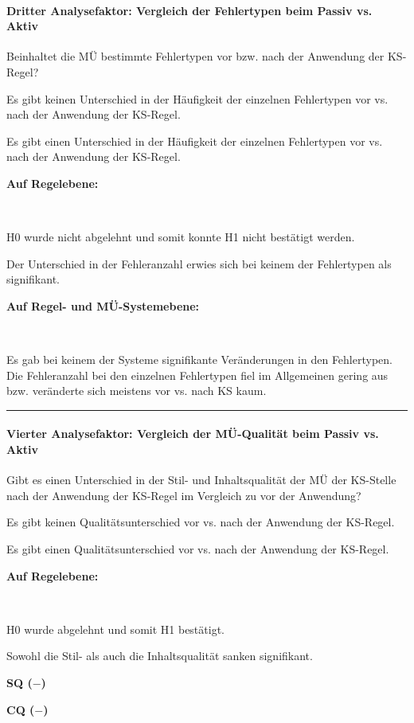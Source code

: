 \paragraph*{Dritter Analysefaktor: Vergleich der Fehlertypen beim Passiv vs. Aktiv}
\begin{description}[font=\normalfont\bfseries]
\item [Fragestellung:] Beinhaltet die MÜ bestimmte Fehlertypen vor bzw. nach der Anwendung der KS-Regel?
\item [H0 --] Es gibt keinen Unterschied in der Häufigkeit der einzelnen Fehlertypen vor vs. nach der Anwendung der KS-Regel.
\item [H1 --] Es gibt einen Unterschied in der Häufigkeit der einzelnen Fehlertypen vor vs. nach der Anwendung der KS-Regel.
\item [Resultat]
\end{description}
\noindent
\parbox[t]{\textwidth}{\textbf{Auf Regelebene:}}\\
\parbox[t]{\textwidth}{
H0 wurde nicht abgelehnt und somit konnte H1 nicht bestätigt werden.

Der Unterschied in der Fehleranzahl erwies sich bei keinem der Fehlertypen als signifikant.
}

\noindent
\parbox[t]{\textwidth}{\textbf{Auf Regel- und MÜ-Systemebene:}}\\
\parbox[t]{\textwidth}{
Es gab bei keinem der Systeme signifikante Veränderungen in den Fehlertypen. Die Fehleranzahl bei den einzelnen Fehlertypen fiel im Allgemeinen gering aus bzw. veränderte sich meistens vor vs. nach KS kaum.
}
\smallskip
\hrule
\paragraph*{Vierter Analysefaktor: Vergleich der MÜ-Qualität beim Passiv vs. Aktiv}
\begin{description}[font=\normalfont\bfseries]
\item [Fragestellung:]  Gibt es einen Unterschied in der Stil- und Inhaltsqualität der MÜ der KS-Stelle nach der Anwendung der KS-Regel im Vergleich zu vor der Anwendung?
\item [H0 --] Es gibt keinen Qualitätsunterschied vor vs. nach der Anwendung der KS-Regel.
\item [H1 --] Es gibt einen Qualitätsunterschied vor vs. nach der Anwendung der KS-Regel.
\item [Resultat]
\end{description}
\noindent
\parbox[t]{.8\textwidth}{\textbf{Auf Regelebene:}}\\
\parbox[t]{.8\textwidth}{
H0 wurde abgelehnt und somit H1 bestätigt.

Sowohl die Stil- als auch die Inhaltsqualität sanken signifikant.
}
\parbox[t]{.04\textwidth}{}
\colorbox{smGreen}{\parbox[t]{.15\textwidth}{
{ \textbf{SQ ($-$)}}

 \textbf{CQ ($-$)}
}}

